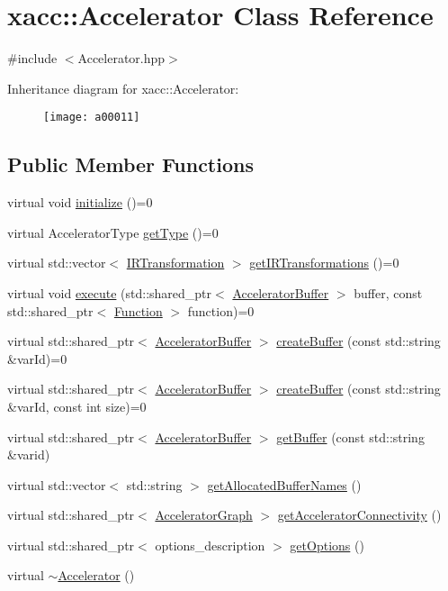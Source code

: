 \hypertarget{a00011}{}\section{xacc\+:\+:Accelerator Class Reference}
\label{a00011}


{\ttfamily \#include $<$Accelerator.\+hpp$>$}

Inheritance diagram for xacc\+:\+:Accelerator\+:\begin{figure}[H]
\begin{center}
\leavevmode
\texttt{[image: a00011]}
\end{center}
\end{figure}
\subsection*{Public Member Functions}
\begin{DoxyCompactItemize}
\item 
virtual void \hyperlink{a00011_a8cdc6f0c5a660013c29c07657a06303b}{initialize} ()=0
\item 
virtual Accelerator\+Type \hyperlink{a00011_aaffc3e4bb9880eb5041b1b58ee4c2665}{get\+Type} ()=0
\item 
virtual std\+::vector$<$ \hyperlink{a00052}{I\+R\+Transformation} $>$ \hyperlink{a00011_ad6e4a642dcb24e552675bcbeff1e1b04}{get\+I\+R\+Transformations} ()=0
\item 
virtual void \hyperlink{a00011_a89b3f3e6294f228abf03a410b0fb1674}{execute} (std\+::shared\+\_\+ptr$<$ \hyperlink{a00013}{Accelerator\+Buffer} $>$ buffer, const std\+::shared\+\_\+ptr$<$ \hyperlink{a00039}{Function} $>$ function)=0
\item 
virtual std\+::shared\+\_\+ptr$<$ \hyperlink{a00013}{Accelerator\+Buffer} $>$ \hyperlink{a00011_aab5046e8d83ab390302e0f49533e95fc}{create\+Buffer} (const std\+::string \&var\+Id)=0
\item 
virtual std\+::shared\+\_\+ptr$<$ \hyperlink{a00013}{Accelerator\+Buffer} $>$ \hyperlink{a00011_a064a2dbd58338364115c260267806945}{create\+Buffer} (const std\+::string \&var\+Id, const int size)=0
\item 
virtual std\+::shared\+\_\+ptr$<$ \hyperlink{a00013}{Accelerator\+Buffer} $>$ \hyperlink{a00011_ab3820be326e28a553fed1a824f4d41d0}{get\+Buffer} (const std\+::string \&varid)
\item 
virtual std\+::vector$<$ std\+::string $>$ \hyperlink{a00011_ae1463d7e405df89fa4af47e8922f4b82}{get\+Allocated\+Buffer\+Names} ()
\item 
virtual std\+::shared\+\_\+ptr$<$ \hyperlink{a00044}{Accelerator\+Graph} $>$ \hyperlink{a00011_adfed940ce1fa476b009344ddf5a4bbc3}{get\+Accelerator\+Connectivity} ()
\item 
virtual std\+::shared\+\_\+ptr$<$ options\+\_\+description $>$ \hyperlink{a00011_a98c9eda6b54367c75667ecfbbf167979}{get\+Options} ()
\item 
virtual \hyperlink{a00011_aed88ab0d71b765f0b0f512684ccd4b55}{$\sim$\+Accelerator} ()
\end{DoxyCompactItemize}

